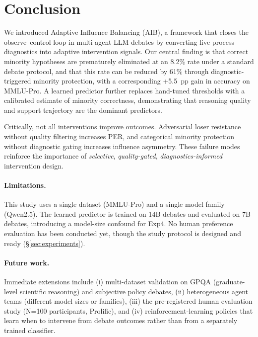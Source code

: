 \section{Conclusion}
\label{sec:conclusion}

We introduced Adaptive Influence Balancing (AIB), a framework that closes
the observe–control loop in multi-agent LLM debates by converting live
process diagnostics into adaptive intervention signals.
Our central finding is that correct minority hypotheses are prematurely
eliminated at an 8.2\% rate under a standard debate protocol, and that
this rate can be reduced by 61\% through diagnostic-triggered minority
protection, with a corresponding +5.5~pp gain in accuracy on MMLU-Pro.
A learned predictor further replaces hand-tuned thresholds with a
calibrated estimate of minority correctness, demonstrating that reasoning
quality and support trajectory are the dominant predictors.

Critically, not all interventions improve outcomes.
Adversarial loser resistance without quality filtering increases PER, and
categorical minority protection without diagnostic gating increases
influence asymmetry.
These failure modes reinforce the importance of
\emph{selective}, \emph{quality-gated}, \emph{diagnostics-informed}
intervention design.

\paragraph{Limitations.}
This study uses a single dataset (MMLU-Pro) and a single model family
(Qwen2.5).
The learned predictor is trained on 14B debates and evaluated on 7B
debates, introducing a model-size confound for Exp4.
No human preference evaluation has been conducted yet, though the study
protocol is designed and ready (\S\ref{sec:experiments}).

\paragraph{Future work.}
Immediate extensions include (i) multi-dataset validation on GPQA
(graduate-level scientific reasoning) and subjective policy debates,
(ii) heterogeneous agent teams (different model sizes or families),
(iii) the pre-registered human evaluation study (N=100 participants,
Prolific), and (iv) reinforcement-learning policies that learn when to
intervene from debate outcomes rather than from a separately trained
classifier.
